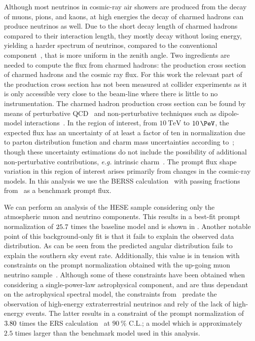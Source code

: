 Although most neutrinos in cosmic-ray air showers are produced from the decay of muons, pions, and kaons, at high energies the decay of charmed hadrons can produce neutrinos as well.
Due to the short decay length of charmed hadrons compared to their interaction length, they mostly decay without losing energy, yielding a harder spectrum of neutrinos, compared to the conventional component~\cite{gaisser2016cosmic}, that is more uniform in the zenith angle.
Two ingredients are needed to compute the flux from charmed hadrons: the production cross section of charmed hadrons and the cosmic ray flux.
For this work the relevant part of the production cross section has not been measured at collider experiments as it is only accessible very close to the beam-line where there is little to no instrumentation.
The charmed hadron production cross section can be found by means of perturbative QCD~\cite{Garzelli:2015psa,Gauld:2015kvh,Gauld:2015yia,Bhattacharya:2016jce,Garzelli:2016xmx} and non-perturbative techniques such as dipole-model interactions~\cite{Goncalves:2006ch,Enberg:2008te,Arguelles:2015wba}.
In the region of interest, from $\SI{10}\TeV$ to $\SI{10}\PeV$, the expected flux has an uncertainty of at least a factor of ten in normalization due to parton distribution function and charm mass uncertainties according to~\cite{Garzelli:2016xmx}; though these uncertainty estimations do not include the possibility of additional non-perturbative contributions, \textit{e.g.} intrinsic charm~\cite{Laha:2016dri}.
The prompt flux shape variation in this region of interest arises primarily from changes in the cosmic-ray models.
In this analysis we use the BERSS calculation~\cite{Bhattacharya:2016jce} with passing fractions from~\cite{Arguelles:2018awr} as a benchmark prompt flux.

We can perform an analysis of the HESE sample considering only the atmospheric muon and neutrino components.
This results in a best-fit prompt normalization of $25.7$ times the baseline model and is shown in .
Another notable point of this background-only fit is that it fails to explain the observed data distribution.
As can be seen from  the predicted angular distribution fails to explain the southern sky event rate.
Additionally, this value is in tension with constraints on the prompt normalization obtained with the up-going muon neutrino sample~\cite{Aartsen:2013eka,Aartsen:2015rwa,Aartsen:2016xlq}.
Although some of these constraints have been obtained when considering a single-power-law astrophysical component, and are thus dependant on the astrophysical spectral model, the constraints from~\cite{Aartsen:2013eka} predate the observation of high-energy extraterrestrial neutrinos and rely of the lack of high-energy events.
The latter results in a constraint of the prompt normalization of $3.80$ times the ERS calculation~\cite{Enberg:2008te} at $\SI{90}\percent$ C.L.; a model which is approximately $2.5$ times larger than the benchmark model used in this analysis.

